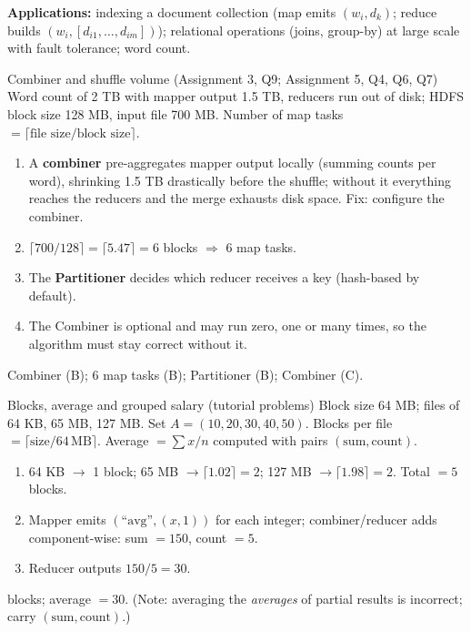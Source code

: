 \textbf{Applications:} indexing a document collection (map emits $(w_i, d_k)$; reduce builds $(w_i, [d_{i1},\dots,d_{im}])$); relational operations
(joins, group-by) at large scale with fault tolerance; word count.

\begin{solved}{Combiner and shuffle volume (Assignment 3, Q9; Assignment 5, Q4, Q6, Q7)}
\Given Word count of 2 TB with mapper output 1.5 TB, reducers run out of disk; HDFS block size 128 MB, input file 700 MB.
\Formula Number of map tasks $= \lceil \text{file size} / \text{block size} \rceil$.
\Steps
\begin{enumerate}[leftmargin=*]
  \item A \textbf{combiner} pre-aggregates mapper output locally (summing counts per word), shrinking 1.5 TB drastically before the shuffle; without it
        everything reaches the reducers and the merge exhausts disk space. Fix: configure the combiner.
  \item $\lceil 700/128 \rceil = \lceil 5.47 \rceil = 6$ blocks $\Rightarrow$ 6 map tasks.
  \item The \textbf{Partitioner} decides which reducer receives a key (hash-based by default).
  \item The Combiner is optional and may run zero, one or many times, so the algorithm must stay correct without it.
\end{enumerate}
\Answer Combiner (B); 6 map tasks (B); Partitioner (B); Combiner (C).
\end{solved}

\begin{solved}{Blocks, average and grouped salary (tutorial problems)}
\Given Block size 64 MB; files of 64 KB, 65 MB, 127 MB. Set $A = (10,20,30,40,50)$.
\Formula Blocks per file $=\lceil \text{size}/64\,\text{MB}\rceil$. Average $=\sum x / n$ computed with pairs $(\text{sum},\text{count})$.
\Steps
\begin{enumerate}[leftmargin=*]
  \item 64 KB $\to$ 1 block; 65 MB $\to \lceil 1.02\rceil = 2$; 127 MB $\to \lceil 1.98\rceil = 2$. Total $=5$ blocks.
  \item Mapper emits $(\text{``avg''}, (x,1))$ for each integer; combiner/reducer adds component-wise: sum $=150$, count $=5$.
  \item Reducer outputs $150/5 = 30$.
\end{enumerate}
 blocks; average $= 30$. (Note: averaging the \emph{averages} of partial results is incorrect; carry $(\text{sum},\text{count})$.)
\end{solved}

